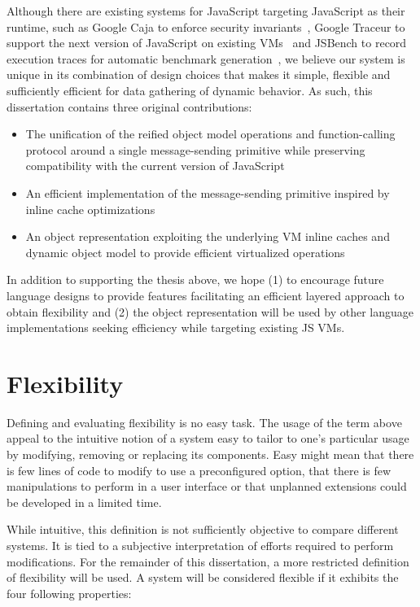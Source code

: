 Although there are existing systems for JavaScript targeting JavaScript as
their runtime, such as Google Caja to enforce security
invariants~\cite{Caja:2012}, Google Traceur to support the next version of
JavaScript on existing VMs~\cite{Traceur:2012} and JSBench to record execution
traces for automatic benchmark generation~\cite{Richards:2011}, we believe our
system is unique in its combination of design choices that makes it simple,
flexible and sufficiently efficient for data gathering of dynamic behavior. As
such, this dissertation contains three original contributions: 
\begin{itemize}
    \item The unification of the reified object model operations and
        function-calling protocol around a single message-sending primitive
        while preserving compatibility with the current version of JavaScript
    \item An efficient implementation of the message-sending primitive inspired
          by inline cache optimizations
    \item An object representation exploiting the underlying VM inline caches
          and dynamic object model to provide efficient virtualized operations
\end{itemize}

In addition to supporting the thesis above, we hope (1) to encourage future
language designs to provide features facilitating an efficient layered approach
to obtain flexibility and (2) the object representation will be used by other
language implementations seeking efficiency while targeting existing JS VMs.

\section{Flexibility}

Defining and evaluating flexibility is no easy task. The usage of the term
above appeal to the intuitive notion of a system easy to tailor to one's
particular usage by modifying, removing or replacing its components. Easy might
mean that there is few lines of code to modify to use a preconfigured option,
that there is few manipulations to perform in a user interface or that unplanned
extensions could be developed in a limited time.

While intuitive, this definition is not sufficiently objective to compare
different systems. It is tied to a subjective interpretation of efforts
required to perform modifications. For the remainder of this dissertation, a
more restricted definition of flexibility will be used. A system will be
considered flexible if it exhibits the four following properties:

